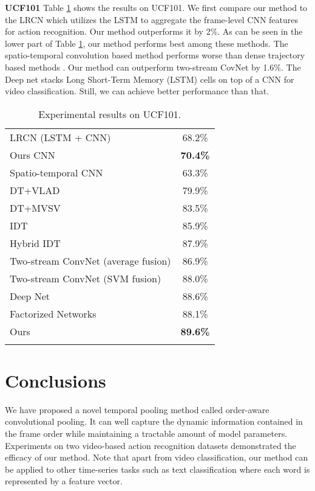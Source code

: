 \documentclass[journal]{IEEEtran}
\begin{document}
\noindent \textbf{UCF101}
Table \ref{tab:overall-ucf101} shows the results on UCF101. We first compare our method to the LRCN \cite{Donahue_2015_CVPR} which utilizes the LSTM to aggregate the frame-level CNN features for action recognition. Our method outperforms it by 2\%. As can be seen in the lower part of Table \ref{tab:overall-ucf101}, our method performs best among these methods. The spatio-temporal convolution based method \cite{KarpathyCVPR14} performs worse than dense trajectory based methods \cite{6909477,Wang2013,peng14}. Our method can outperform two-stream CovNet \cite{Andrew14} by 1.6\%.
The Deep net \cite{Ng2015} stacks Long Short-Term Memory (LSTM) cells on top of a CNN for video classification. Still, we can achieve better performance than that.
\begin{table}[htbp]\normalsize
\caption{Experimental results on UCF101.}
  \centering

  \renewcommand{\arraystretch}{1.1}
    \begin{tabular*}{8cm}{lc}
    \hline \noalign{\smallskip}
    LRCN \cite{Donahue_2015_CVPR} (LSTM + CNN) & 68.2\% \\
    Ours CNN & \textbf{70.4\%} \\
    \hline \noalign{\smallskip}
    Spatio-temporal CNN \cite{KarpathyCVPR14} & 63.3\% \\
    DT+VLAD \cite{6909477} & 79.9\% \\
    DT+MVSV \cite{6909477} & 83.5\% \\
    IDT \cite{Wang2013} & 85.9\% \\
    Hybrid IDT \cite{peng14} & 87.9\% \\
    Two-stream ConvNet (average fusion) \cite{Andrew14} & 86.9\% \\
    Two-stream ConvNet (SVM fusion) \cite{Andrew14} & 88.0\% \\
    Deep Net \cite{Ng2015} & 88.6\% \\
    Factorized Networks \cite{Sun_2015_ICCV} & 88.1\% \\
    Ours & \textbf{89.6\%}
    \\ \hline \noalign{\smallskip}
    \end{tabular*}%

  \label{tab:overall-ucf101}%
\end{table}%



\section{Conclusions}
\label{conclusion}
We have proposed a novel temporal pooling method called order-aware convolutional pooling. It can well capture the dynamic information contained in the frame order while maintaining a tractable amount of model parameters. Experiments on two video-based action recognition datasets demonstrated the efficacy of our method. Note that apart from video classification, our method can be applied to other time-series tasks such as text classification where each word is represented by a feature vector.








\ifCLASSOPTIONcaptionsoff
  \newpage
\fi







\end{document}
